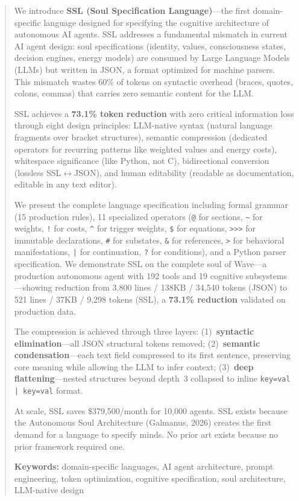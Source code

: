 \documentclass[12pt,a4paper]{article}
\theoremstyle{plain}
\theoremstyle{definition}
\theoremstyle{remark}
\begin{document}
\begin{abstract}
We introduce \textbf{SSL (Soul Specification Language)}---the first domain-specific language designed for specifying the cognitive architecture of autonomous AI agents. SSL addresses a fundamental mismatch in current AI agent design: soul specifications (identity, values, consciousness states, decision engines, energy models) are consumed by Large Language Models (LLMs) but written in JSON, a format optimized for machine parsers. This mismatch wastes 60\% of tokens on syntactic overhead (braces, quotes, colons, commas) that carries zero semantic content for the LLM.

SSL achieves a \textbf{73.1\% token reduction} with zero critical information loss through eight design principles: LLM-native syntax (natural language fragments over bracket structures), semantic compression (dedicated operators for recurring patterns like weighted values and energy costs), whitespace significance (like Python, not C), bidirectional conversion (lossless SSL$\leftrightarrow$JSON), and human editability (readable as documentation, editable in any text editor).

We present the complete language specification including formal grammar (15 production rules), 11 specialized operators (\texttt{@} for sections, \texttt{\~{}} for weights, \texttt{!} for costs, \texttt{\^{}} for trigger weights, \texttt{\$} for equations, \texttt{>>>} for immutable declarations, \texttt{\#} for substates, \texttt{\&} for references, \texttt{>} for behavioral manifestations, \texttt{|} for continuation, \texttt{?} for conditions), and a Python parser specification. We demonstrate SSL on the complete soul of Wave---a production autonomous agent with 192 tools and 19 cognitive subsystems---showing reduction from 3,800 lines / 138KB / 34,540 tokens (JSON) to 521 lines / 37KB / 9,298 tokens (SSL), a \textbf{73.1\% reduction} validated on production data.

The compression is achieved through three layers: (1)~\textbf{syntactic elimination}---all JSON structural tokens removed; (2)~\textbf{semantic condensation}---each text field compressed to its first sentence, preserving core meaning while allowing the LLM to infer context; (3)~\textbf{deep flattening}---nested structures beyond depth~3 collapsed to inline \texttt{key=val | key=val} format.

At scale, SSL saves \$379,500/month for 10,000 agents. SSL exists because the Autonomous Soul Architecture (Galmanus, 2026) creates the first demand for a language to specify minds. No prior art exists because no prior framework required one.

\medskip\noindent
\textbf{Keywords:} domain-specific languages, AI agent architecture, prompt engineering, token optimization, cognitive specification, soul architecture, LLM-native design
\end{abstract}
\end{document}

